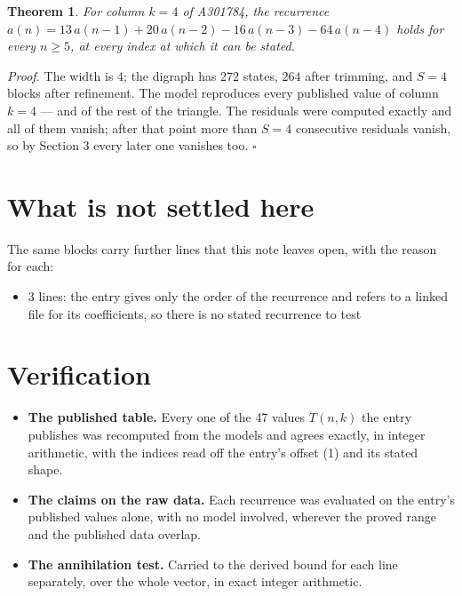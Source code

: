 \documentclass[11pt]{article}
\newtheorem{theorem}{Theorem}
\theoremstyle{definition}
\begin{document}
\begin{theorem} For column $k = 4$ of A301784, the recurrence $a(n) = 13\,a(n-1) + 20\,a(n-2) - 16\,a(n-3) - 64\,a(n-4)$ holds for every $n \ge 5$, at every index at which it can be stated.\end{theorem}

{\itshape Proof.} The width is $4$; the digraph has $272$ states, $264$ after trimming, and $S = 4$ blocks after refinement. The model reproduces every published value of column $k = 4$ --- and of the rest of the triangle. The residuals were computed exactly and all of them vanish; after that point more than $S = 4$ consecutive residuals vanish, so by Section 3 every later one vanishes too. $\square$

\section{What is not settled here}

The same blocks carry further lines that this note leaves open, with the reason for each:

\begin{itemize}

\item 3 lines: the entry gives only the order of the recurrence and refers to a linked file for its coefficients, so there is no stated recurrence to test

\end{itemize}

\section{Verification}

\begin{itemize}

\item {\bfseries The published table.} Every one of the 47 values $T(n,k)$ the entry publishes was recomputed from the models and agrees exactly, in integer arithmetic, with the indices read off the entry's offset (1) and its stated shape.

\item {\bfseries The claims on the raw data.} Each recurrence was evaluated on the entry's published values alone, with no model involved, wherever the proved range and the published data overlap.

\item {\bfseries The annihilation test.} Carried to the derived bound for each line separately, over the whole vector, in exact integer arithmetic.

\end{itemize}
\end{document}
